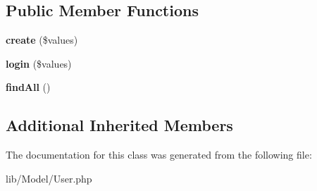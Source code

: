 \subsection*{Public Member Functions}
\begin{DoxyCompactItemize}
\item 
{\bfseries create} (\$values)\hypertarget{class_my_app_1_1_model_1_1_user_acf5c0d1e8a2171c648f6ca5914b0dfce}{}\label{class_my_app_1_1_model_1_1_user_acf5c0d1e8a2171c648f6ca5914b0dfce}

\item 
{\bfseries login} (\$values)\hypertarget{class_my_app_1_1_model_1_1_user_a5b54bb950ece023acfc08574cb3c3500}{}\label{class_my_app_1_1_model_1_1_user_a5b54bb950ece023acfc08574cb3c3500}

\item 
{\bfseries find\+All} ()\hypertarget{class_my_app_1_1_model_1_1_user_a2c34790e418f92691854806e8ef6f819}{}\label{class_my_app_1_1_model_1_1_user_a2c34790e418f92691854806e8ef6f819}

\end{DoxyCompactItemize}
\subsection*{Additional Inherited Members}


The documentation for this class was generated from the following file\+:\begin{DoxyCompactItemize}
\item 
lib/\+Model/User.\+php\end{DoxyCompactItemize}
